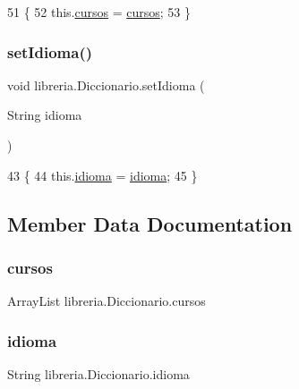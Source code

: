 \begin{DoxyCode}
51                                             \{
52         this.\mbox{\hyperlink{classlibreria_1_1_diccionario_a192b58fb0f0773bc0f857c0481a507c5}{cursos}} = \mbox{\hyperlink{classlibreria_1_1_diccionario_a192b58fb0f0773bc0f857c0481a507c5}{cursos}};
53     \}
\end{DoxyCode}
\mbox{\label{classlibreria_1_1_diccionario_a347e68b4c9c4afc6e20ca93f28be30a2}} 
\subsubsection{\texorpdfstring{set\+Idioma()}{setIdioma()}}
{\footnotesize\ttfamily void libreria.\+Diccionario.\+set\+Idioma (\begin{DoxyParamCaption}\item[{String}]{idioma }\end{DoxyParamCaption})\hspace{0.3cm}{\ttfamily [inline]}}


\begin{DoxyCode}
43                                          \{
44         this.\mbox{\hyperlink{classlibreria_1_1_diccionario_ab5efd7c7392d8c91283d0c5270408d70}{idioma}} = \mbox{\hyperlink{classlibreria_1_1_diccionario_ab5efd7c7392d8c91283d0c5270408d70}{idioma}};
45     \}
\end{DoxyCode}


\subsection{Member Data Documentation}
\mbox{\label{classlibreria_1_1_diccionario_a192b58fb0f0773bc0f857c0481a507c5}} 
\subsubsection{\texorpdfstring{cursos}{cursos}}
{\footnotesize\ttfamily Array\+List libreria.\+Diccionario.\+cursos\hspace{0.3cm}{\ttfamily [private]}}

\mbox{\label{classlibreria_1_1_diccionario_ab5efd7c7392d8c91283d0c5270408d70}} 
\subsubsection{\texorpdfstring{idioma}{idioma}}
{\footnotesize\ttfamily String libreria.\+Diccionario.\+idioma\hspace{0.3cm}{\ttfamily [private]}}


